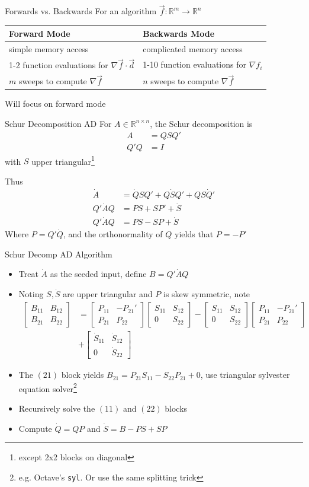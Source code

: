 \documentclass[12pt]{beamer}
\renewcommand{\d}[1]{\dot{#1}}
\newcommand{\fn}[1]{\footnote{\footnotesize #1}}
\newcommand{\grad}{\nabla}
\newcommand{\mat}[4]{\begin{bmatrix} #1 & #2\\#3 & #4\end{bmatrix}}
\begin{document}
  \begin{frame}{Forwards vs. Backwards}
    \centering
    For an algorithm $\vec{f}:\mathbb{R}^m \to \mathbb{R}^n$\\[.5in]
    \begin{table}[h!]
      \begin{tabular}{l | l}
        Forward Mode & Backwards Mode\\\hline
        simple memory access & complicated memory access\\
        1-2 function evaluations for $\grad \vec{f} \cdot \vec{d}$  & 1-10 function evaluations for $\grad f_i$\\
        $m$ sweeps to compute $\grad \vec{f}$ & $n$ sweeps to compute $\grad \vec{f}$
      \end{tabular}
    \end{table}
    Will focus on forward mode
  \end{frame}

  \begin{frame}{Schur Decomposition AD}
    For $A \in \mathbb{R}^{n \times n}$, the Schur decomposition is
    \begin{align*}
      A &= Q S Q'\\
      Q'Q &= I
    \end{align*}
    with $S$ upper triangular\fn{except 2x2 blocks on diagonal}

    Thus
    \begin{align*}
      \d{A} &= \d{Q}SQ' + Q\d{S}Q' + QS\d{Q}'\\
      Q' \d{A} Q &= P S + S P' + \d{S}\\
      Q' \d{A} Q &= P S - S P + \d{S}
    \end{align*}
    Where $P = Q'\d{Q}$, and the orthonormality of $Q$ yields that $P = -P'$

  \end{frame}

  \begin{frame}{Schur Decomp AD Algorithm}
    \begin{itemize}
      \item Treat $\d{A}$ as the seeded input, define $B = Q' \d{A} Q$
      \item Noting $S, \d{S}$ are upper triangular and $P$ is skew symmetric, note
      \begin{align*}
        \mat{B_{11}}{B_{12}}{B_{21}}{B_{22}} &= \mat{P_{11}}{-P_{21}'}{P_{21}}{P_{22}} \mat{S_{11}}{S_{12}}{0}{S_{22}} - \mat{S_{11}}{S_{12}}{0}{S_{22}} \mat{P_{11}}{-P_{21}'}{P_{21}}{P_{22}}\\
        &+ \mat{\d{S}_{11}}{\d{S}_{12}}{0}{\d{S}_{22}}
      \end{align*}
      \item The $(21)$ block yields $B_{21} = P_{21}S_{11} - S_{22}P_{21} + 0$, use triangular sylvester equation solver\fn{e.g. Octave's \texttt{syl}. Or use the same splitting trick}
      \item Recursively solve the $(11)$ and $(22)$ blocks
      \item Compute $\d{Q} = QP$ and $\d{S} = B - PS + SP$
    \end{itemize}
  \end{frame}
\end{document}
